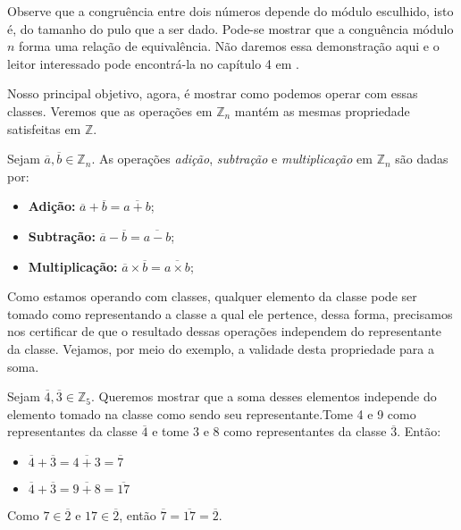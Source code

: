 Observe que a congru\^{e}ncia entre dois n\'{u}meros depende do m\'{o}dulo esculhido, isto \'{e}, do tamanho 
do pulo que a ser dado. Pode-se mostrar que a congu\^{e}ncia m\'{o}dulo $n$ forma uma rela\c{c}\~{a}o de 
equival\^{e}ncia. N\~{a}o daremos essa demonstra\c{c}\~{a}o aqui e o leitor interessado pode encontr\'{a}-la no 
cap\'{i}tulo 4 em \cite{cou:2014}.

Nosso principal objetivo, agora, \'{e} mostrar como podemos operar com essas classes. Veremos que as 
opera\c{c}\~{o}es em $\mathbb{Z}_{n}$ mant\'{e}m as mesmas propriedade satisfeitas em $\mathbb{Z}$.

\begin{Df}
Sejam $\overline{a},\overline{b}\in\mathbb{Z}_{n}$. As opera\c{c}\~{o}es \textit{adi\c{c}\~{a}o}, 
\textit{subtra\c{c}\~{a}o} e \textit{multiplica\c{c}\~{a}o} em $\mathbb{Z}_{n}$ s\~{a}o dadas por:
	\begin{itemize}
			\item \textbf{Adi\c{c}\~{a}o:} $\overline{a}+\overline{b}=\overline{a+b}$;
			\item \textbf{Subtra\c{c}\~{a}o:} $\overline{a}-\overline{b}=\overline{a-b}$;
			\item \textbf{Multiplica\c{c}\~{a}o:} $\overline{a}\times\overline{b}=\overline{a\times b}$;
	\end{itemize}
\end{Df}

Como estamos operando com classes, qualquer elemento da classe pode ser tomado como representando 
a classe a qual ele pertence, dessa forma, precisamos nos certificar de que o resultado dessas opera\c{c}\~{o}es 
independem do representante da classe. Vejamos, por meio do exemplo, a validade desta propriedade para a soma.

Sejam $\overline{4},\overline{3}\in\mathbb{Z}_{5}$. Queremos mostrar que a soma desses elementos independe do 
elemento tomado na classe como sendo seu representante.Tome 4 e 9 como representantes da classe $\overline{4}$ e
tome 3 e 8 como representantes da classe $\overline{3}$. Ent\~{a}o:
				\begin{itemize}
					\item $\overline{4}+\overline{3}=\overline{4+3}=\overline{7}$
					\item $\overline{4}+\overline{3}=\overline{9+8}=\overline{17}$ 
				\end{itemize}
Como $7\in\overline{2}$ e $17\in\overline{2}$, ent\~{a}o $\overline{7}=\overline{17}=\overline{2}$.

